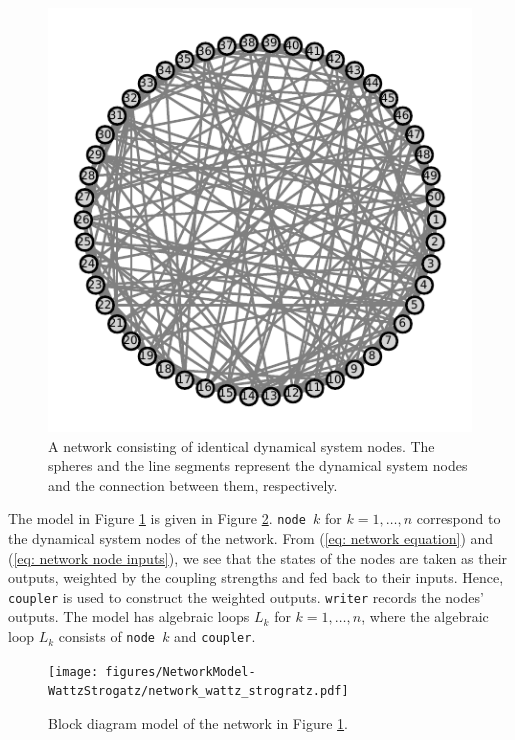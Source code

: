 \documentclass{juliacon}
\begin{document}
{\begin{figure}
    \centering
    \includegraphics[width=\linewidth]{figures/Networks/wattz_strogatz.pdf}    
    \caption{A network consisting of identical dynamical system nodes. The spheres and the line segments represent the dynamical system nodes and the connection between them, respectively.}
    \label{fig: network graph}
\end{figure}

The model in Figure \ref{fig: network graph} is given in Figure \ref{fig: network model}. \texttt{node $k$} for $k =1, \ldots, n$ correspond to the dynamical system nodes of the network.  From (\ref{eq: network equation}) and (\ref{eq: network node inputs}), we see that the states of the nodes are taken as their outputs, weighted by the coupling strengths and fed back to their inputs. Hence, \texttt{coupler} is used to construct the weighted outputs. \texttt{writer} records the nodes' outputs. The model has algebraic loops $L_k$ for $k = 1, \ldots, n$, where the algebraic loop $L_k$ consists of \texttt{node $k$} and \texttt{coupler}. 

\begin{figure}
    \centering
    \texttt{[image: figures/NetworkModel-WattzStrogatz/network\_wattz\_strogratz.pdf]}
    \caption{Block diagram model of the network in Figure \ref{fig: network graph}.}
    \label{fig: network model}
\end{figure}

}
\end{document}

